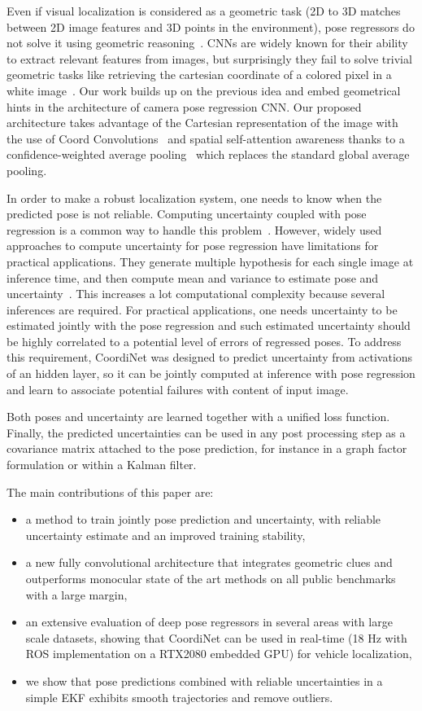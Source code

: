 \documentclass[10pt,twocolumn,letterpaper]{article}
\begin{document}
Even if visual localization is considered as a geometric task (2D to 3D matches between 2D image features and 3D points in the environment), pose regressors do not solve it using geometric reasoning~\cite{Sattler2019}. CNNs are widely known for their ability to extract relevant features from images, but surprisingly they fail to solve trivial geometric tasks like retrieving the cartesian coordinate of a colored pixel in a white image~\cite{coordconv}. Our work builds up on the previous idea and embed geometrical hints in the architecture of camera pose regression CNN. Our proposed architecture takes advantage of the Cartesian representation of the image with the use of Coord Convolutions~\cite{coordconv} and spatial self-attention awareness thanks to a confidence-weighted average pooling~\cite{fc4} which replaces the standard global average pooling.

In order to make a robust localization system, one needs to know when the predicted pose is not reliable. Computing uncertainty coupled with pose regression is a common way to handle this problem~\cite{bayesianposenet}. However, widely used approaches to compute uncertainty for pose regression have limitations for practical applications. They generate multiple hypothesis for each single image at inference time, and then compute mean and variance to estimate pose and uncertainty~\cite{bayesianposenet,RVL}. This increases a lot computational complexity because several inferences are required. For practical applications, one needs uncertainty to be estimated jointly with the pose regression and such estimated uncertainty should be highly correlated to a potential level of errors of regressed poses. To address this requirement, CoordiNet was designed to predict uncertainty from activations of an hidden layer, so it can be jointly computed at inference with pose regression and learn to associate potential failures with content of input image.

Both poses and uncertainty are learned together with a unified loss function. Finally, the predicted uncertainties can be used in any post processing step as a covariance matrix attached to the pose prediction, for instance in a graph factor~\cite{Dellaert2017} formulation or within a Kalman filter.

The main contributions of this paper are:
\begin{itemize}
    \item a method to train jointly pose prediction and uncertainty, with reliable uncertainty estimate and an improved training stability,
    \item a new fully convolutional architecture that integrates geometric clues and outperforms monocular state of the art methods on all public benchmarks with a large margin,
    \item an extensive evaluation of deep pose regressors in several areas with large scale datasets, showing that CoordiNet can be used in real-time (18 Hz with ROS implementation on a RTX2080 embedded GPU) for vehicle localization,
    \item we show that pose predictions combined with reliable uncertainties in a simple EKF exhibits smooth trajectories and remove outliers.
\end{itemize}
\end{document}
